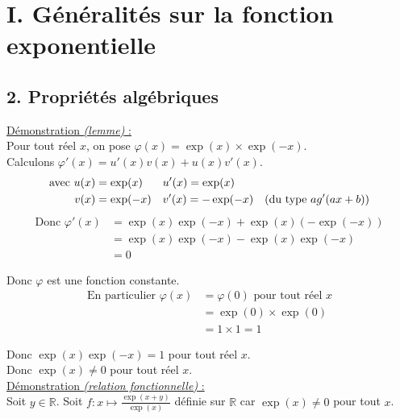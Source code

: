 \documentclass[11pt,a4paper]{article}
\title{\doctitre}
\author{\docniveau \\ \doctheme\text{ - }\doctype}
\date{}
\begin{document}
\maketitle
\pagestyle{custom}
\thispagestyle{custom}

\section*{I. Généralités sur la fonction exponentielle}


\subsection*{2. Propriétés algébriques}

\underline{Démonstration \emph{(lemme)} :}  \\
Pour tout réel $x$, on pose  $\varphi(x)=\exp(x)\times\exp(-x)$. \\

Calculons $\varphi'(x)=u'(x)v(x)+u(x)v'(x)$.
\vspace{-4pt}
\begin{align*}
    \text{avec }u(x) =\exp(x)\color{white}-\color{black}\quad&u'(x)=\exp(x)\\
    v(x)=\exp(-x)\quad&v'(x)=-\exp(-x) \quad\text{(du type $ag'(ax+b)$)}
\end{align*}
\begin{align*}
    \text{Donc }\varphi'(x)&=\exp(x)\exp(-x)+\exp(x)(-\exp(-x)) \\
    &=\exp(x)\exp(-x)-\exp(x)\exp(-x) \\
    &=0
\end{align*}

Donc $\varphi$ est une fonction constante.
\begin{align*}
    \text{En particulier }\varphi(x)&=\varphi(0)\text{ pour tout réel }x \\
    &=\exp(0)\times\exp(0)\\
    &=1\times1=1
\end{align*}

Donc $\exp(x)\exp(-x)=1$ pour tout réel $x$. \\
Donc $\exp(x)\not=0$ pour tout réel $x$. \\

\underline{Démonstration \emph{(relation fonctionnelle)} :}  \\
Soit $y\in\mathbb{R}$. Soit $\displaystyle f:x\mapsto \frac{\exp(x+y)}{\exp(x)}$ définie sur $\mathbb{R}$ car $\exp(x)\not=0$ pour tout $x$.
\end{document}
